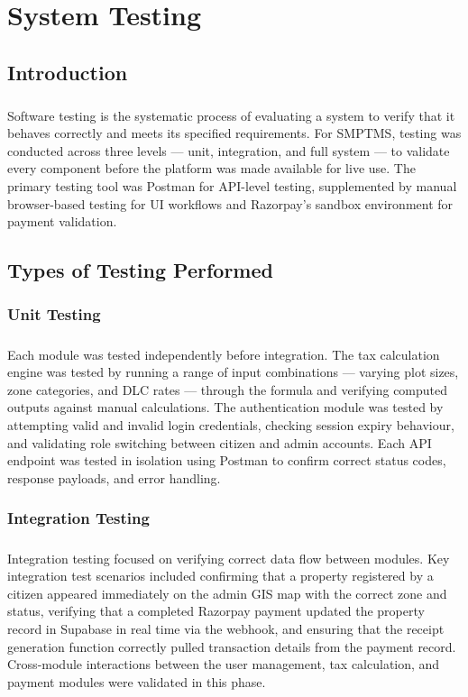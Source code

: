 \chapter{System Testing}
\section{Introduction}
\paragraph{}Software testing is the systematic process of evaluating a system to verify that it behaves correctly and meets its specified requirements. For SMPTMS, testing was conducted across three levels --- unit, integration, and full system --- to validate every component before the platform was made available for live use. The primary testing tool was Postman for API-level testing, supplemented by manual browser-based testing for UI workflows and Razorpay's sandbox environment for payment validation.

\section{Types of Testing Performed}
\subsection{Unit Testing}
\paragraph{}Each module was tested independently before integration. The tax calculation engine was tested by running a range of input combinations --- varying plot sizes, zone categories, and DLC rates --- through the formula and verifying computed outputs against manual calculations. The authentication module was tested by attempting valid and invalid login credentials, checking session expiry behaviour, and validating role switching between citizen and admin accounts. Each API endpoint was tested in isolation using Postman to confirm correct status codes, response payloads, and error handling.

\subsection{Integration Testing}
\paragraph{}Integration testing focused on verifying correct data flow between modules. Key integration test scenarios included confirming that a property registered by a citizen appeared immediately on the admin GIS map with the correct zone and status, verifying that a completed Razorpay payment updated the property record in Supabase in real time via the webhook, and ensuring that the receipt generation function correctly pulled transaction details from the payment record. Cross-module interactions between the user management, tax calculation, and payment modules were validated in this phase.

